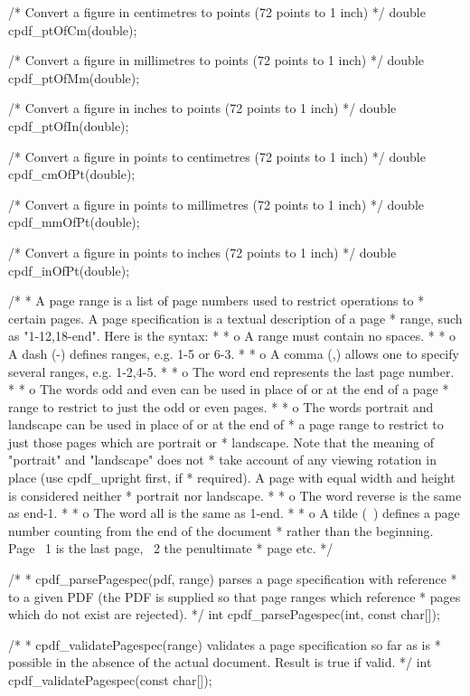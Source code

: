 /* Convert a figure in centimetres to points (72 points to 1 inch) */
double cpdf_ptOfCm(double);

/* Convert a figure in millimetres to points (72 points to 1 inch) */
double cpdf_ptOfMm(double);

/* Convert a figure in inches to points (72 points to 1 inch) */
double cpdf_ptOfIn(double);

/* Convert a figure in points to centimetres (72 points to 1 inch) */
double cpdf_cmOfPt(double);

/* Convert a figure in points to millimetres (72 points to 1 inch) */
double cpdf_mmOfPt(double);

/* Convert a figure in points to inches (72 points to 1 inch) */
double cpdf_inOfPt(double);

/*
 * A page range is a list of page numbers used to restrict operations to
 * certain pages. A page specification is a textual description of a page
 * range, such as "1-12,18-end". Here is the syntax:
 *
 * o A range must contain no spaces.
 *
 * o A dash (-) defines ranges, e.g. 1-5 or 6-3.
 *
 * o A comma (,) allows one to specify several ranges, e.g. 1-2,4-5.
 *
 * o The word end represents the last page number.
 *
 * o The words odd and even can be used in place of or at the end of a page
 * range to restrict to just the odd or even pages.
 *
 * o The words portrait and landscape can be used in place of or at the end of
 * a page range to restrict to just those pages which are portrait or
 * landscape. Note that the meaning of "portrait" and "landscape" does not
 * take account of any viewing rotation in place (use cpdf_upright first, if
 * required). A page with equal width and height is considered neither
 * portrait nor landscape.
 *
 * o The word reverse is the same as end-1.
 *
 * o The word all is the same as 1-end.
 *
 * o A tilde (~) defines a page number counting from the end of the document
 * rather than the beginning. Page ~1 is the last page, ~2 the penultimate
 * page etc.
 */

/*
 * cpdf_parsePagespec(pdf, range) parses a page specification with reference
 * to a given PDF (the PDF is supplied so that page ranges which reference
 * pages which do not exist are rejected).
 */
int cpdf_parsePagespec(int, const char[]);

/*
 * cpdf_validatePagespec(range) validates a page specification so far as is
 * possible in the absence of the actual document. Result is true if valid.
 */
int cpdf_validatePagespec(const char[]);


